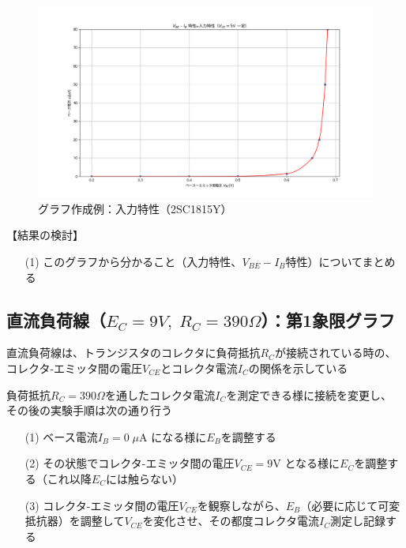 \documentclass[uplatex,a4paper,11pt,oneside,openany]{jsbook}
\begin{document}
\vfill

\newpage

\begin{figure}[H]
  \centering
   \includegraphics[keepaspectratio, scale=0.45, angle=0]
               {figs/png/x3static.png}
               \caption{グラフ作成例：入力特性（2SC1815Y）}
               \label{fig:iocharM1Yd}
\end{figure}

【結果の検討】

\begin{enumerate}
	\item[(1)] このグラフから分かること（入力特性、$V_{BE}-I_B$特性）についてまとめる
\end{enumerate}

\newpage

\subsection{直流負荷線（$E_C=9V,\;R_C=390\Omega$）：第1象限グラフ}

直流負荷線は、トランジスタのコレクタに負荷抵抗$R_C$が接続されている時の、
コレクタ-エミッタ間の電圧$V_{CE}$とコレクタ電流$I_C$の関係を示している


負荷抵抗$R_C=390\Omega$を通したコレクタ電流$I_C$を測定できる様に接続を変更し、
その後の実験手順は次の通り行う

\begin{enumerate}
\item[(1)] ベース電流$I_B=0\;\mu$A になる様に$E_B$を調整する
\item[(2)] その状態でコレクタ-エミッタ間の電圧$V_{CE}=9$V となる様に$E_C$を調整する（これ以降$E_C$には触らない）
\item[(3)] コレクタ-エミッタ間の電圧$V_{CE}$を観察しながら、$E_B$（必要に応じて可変抵抗器）を調整して$V_{CE}$を変化させ、その都度コレクタ電流$I_C$測定し記録する  
\end{enumerate}
\end{document}
